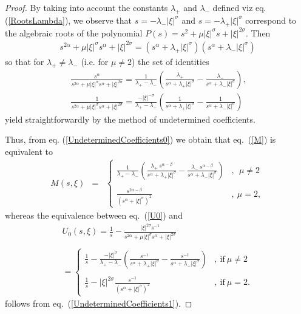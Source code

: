 \documentclass{amsart}
\theoremstyle{definition}
\theoremstyle{remark}
\numberwithin{equation}{section}
\begin{document}
\begin{proof}
	By taking into account the constants $\lambda_+$ and $\lambda_-$ defined viz eq. (\ref{RootsLambda}), we observe that $s=-\lambda_-|\xi|^\sigma$ and $s=-\lambda_+|\xi|^\sigma$ correspond to the algebraic roots of the polynomial $P(s)=s^2+\mu|\xi|^\sigma s+|\xi|^{2\sigma}$. Then
	\begin{eqnarray*}
		\label{FactorizationIds}s^{2\alpha}+\mu|\xi|^\sigma s^\alpha+|\xi|^{2\sigma}=(s^\alpha+\lambda_+|\xi|^\sigma)(s^\alpha+\lambda_-|\xi|^\sigma)
	\end{eqnarray*}
	so that for $\lambda_+\neq \lambda_-$ (i.e. for $\mu\neq 2$) the set of identities
	\begin{eqnarray}
		\label{UndeterminedCoefficients0}
		~\frac{s^\alpha}{s^{2\alpha}+\mu|\xi|^\sigma s^\alpha+|\xi|^{2\sigma}}=\frac{1}{\lambda_+-\lambda_-}\left(\frac{\lambda_+}{s^\alpha+\lambda_+|\xi|^\sigma}-\frac{\lambda_-}{s^\alpha+\lambda_-|\xi|^\sigma}\right), \\
		\label{UndeterminedCoefficients1}
		~\frac{1}{s^{2\alpha}+\mu|\xi|^\sigma s^\alpha+|\xi|^{2\sigma}}=\frac{-|\xi|^{-\sigma}}{\lambda_+-\lambda_-}\left(\frac{1}{s^\alpha+\lambda_+|\xi|^\sigma}-\frac{1}{s^\alpha+\lambda_-|\xi|^\sigma}\right)
	\end{eqnarray}
	yield straightforwardly by the method of undetermined coefficients.
	
	Thus, from eq. (\ref{UndeterminedCoefficients0}) we obtain that eq.~(\ref{M}) is equivalent to
	\begin{eqnarray}\label{MDivision}
		M(s,\xi)&=&\begin{cases}
			\displaystyle \frac{1}{\lambda_+-\lambda_-}\left(\frac{\lambda_+~s^{\alpha-\beta}}{s^\alpha+\lambda_+|\xi|^\sigma}-\frac{\lambda_-~s^{\alpha-\beta}}{s^\alpha+\lambda_-|\xi|^\sigma}\right)&,~ ~\mu\neq 2 \\ \ \\
			\displaystyle\frac{s^{2\alpha-\beta}}{(s^\alpha+|\xi|^\sigma)^2}&,~\mu= 2,
		\end{cases}
	\end{eqnarray}
	whereas the equivalence between eq.~(\ref{U0}) and 
	\begin{eqnarray}\label{U0Division}
			U_0(s,\xi)=\displaystyle \frac{1}{s}-\frac{|\xi|^{2\sigma}s^{-1}}{s^{2\alpha}+\mu |\xi|^\sigma s^{\alpha} +|\xi|^{2\sigma}} \nonumber \\ \nonumber \\
			=\begin{cases}
				\displaystyle 	\frac{1}{s}-\frac{-|\xi|^\sigma}{\lambda_+-\lambda_-}\left(\frac{s^{-1}}{s^\alpha+\lambda_+|\xi|^\sigma}-\frac{s^{-1}}{s^\alpha+\lambda_-|\xi|^\sigma}\right) &,~ \mbox{if}~\mu\neq 2 \\ \ \\
				\displaystyle \frac{1}{s}-|\xi|^{2\sigma}\frac{s^{-1}}{(s^\alpha+|\xi|^\sigma)^2}&,~\mbox{if}~\mu= 2.
			\end{cases}
	\end{eqnarray}
	follows from eq.~(\ref{UndeterminedCoefficients1}).
	

\end{proof}
\end{document}
